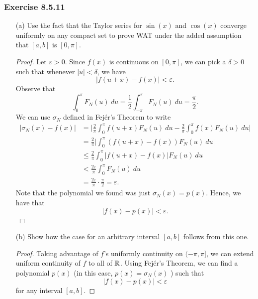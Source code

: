 \subsubsection{Exercise 8.5.11}
\begin{enumerate}
    \item[(a)] Use the fact that the Taylor series for \( \sin(x)  \) and \( \cos(x) \) converge uniformly on any compact set to prove WAT under the added assumption that \( [a,b] \) is \( [0, \pi] \).
        \begin{proof}
            Let \( \varepsilon > 0  \). Since \( f(x)  \) is continuous on \( [0, \pi] \), we can pick a \( \delta > 0 \) such that whenever \( | u | < \delta  \), we have
            \[  | f(u+x) - f(x)  | < \varepsilon. \] 
            Observe that 
            \[ \int_{ 0 }^{ \pi } F_{N}(u)   \ du = \frac{ 1 }{ 2 } \int_{ - \pi  }^{ \pi  } F_{N}(u)  \ du = \frac{ \pi }{ 2 }. \]
            We can use \( \sigma_{N} \) defined in Fej\'{e}r's  Theorem to write
            \begin{align*}
                | \sigma_{N}(x) - f(x)  | &= \Big| \frac{ 2 }{ \pi  } \int_{ 0 }^{ \pi  } f(u+x) F_{N}(u)   \ du - \frac{ 2 }{ \pi  } \int_{ 0  }^{ \pi  } f(x) F_{N}(u)  \ du  \Big|  \\
                                          &= \frac{ 2 }{ \pi  } \Big| \int_{ 0 }^{ \pi  } (f(u+x)-f(x)) F_{N}(u) \ du \Big| \\
                                          &\leq \frac{ 2  }{ \pi  } \int_{ 0 }^{ \pi  } | f(u+x) - f(x) | F_{N}(u) \ du \\
                                          &< \frac{ 2 \varepsilon  }{ \pi  } \int_{ 0 }^{ \pi  } F_{N}(u) \ du \\
                                          &= \frac{ 2 \varepsilon }{ \pi  } \cdot \frac{ \pi }{ 2 } = \varepsilon.
            \end{align*}
        Note that the polynomial we found was just \( \sigma _{N}(x)  = p(x) \). Hence, we have that 
        \[  | f(x) - p(x) | < \varepsilon. \]
        \end{proof}
    \item[(b)] Show how the case for an arbitrary interval \( [a,b] \) follows from this one.
        \begin{proof}
            Taking advantage of \( f  \)'s uniformly continuity on \( ( -\pi ,\pi ] \), we can extend uniform continuity of \( f  \) to all of \( \mathbb{R}  \). Using  Fej\'{e}r's Theorem, we can find a polynomial \( p(x) \) (in this case, \( p(x) = \sigma_{N}(x) \) ) such that 
            \[  | f(x) - p(x) | < \varepsilon \]for any interval \( [a,b] \).  
        \end{proof}
\end{enumerate}
